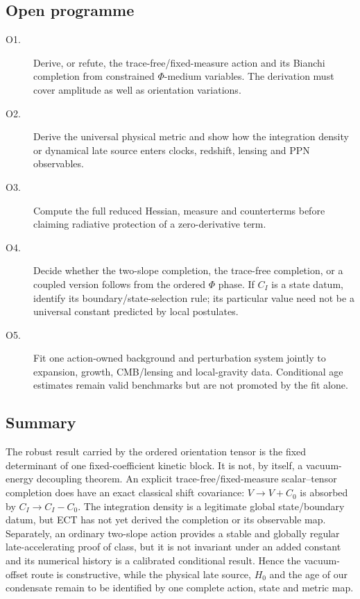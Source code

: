 \subsection{Open programme}
\label{subsec:cc_open}

\begin{description}
\item[O1.] Derive, or refute, the trace-free/fixed-measure action and its
Bianchi completion from constrained $\Phi$-medium variables.  The derivation
must cover amplitude as well as orientation variations.
\item[O2.] Derive the universal physical metric and show how the integration
density or dynamical late source enters clocks, redshift, lensing and PPN
observables.
\item[O3.] Compute the full reduced Hessian, measure and counterterms before
claiming radiative protection of a zero-derivative term.
\item[O4.] Decide whether the two-slope completion, the trace-free completion,
or a coupled version follows from the ordered $\Phi$ phase.  If $C_I$ is a
state datum, identify its boundary/state-selection rule; its particular
value need not be a universal constant predicted by local postulates.
\item[O5.] Fit one action-owned background and perturbation system jointly to
expansion, growth, CMB/lensing and local-gravity data.  Conditional age
estimates remain valid benchmarks but are not promoted by the fit alone.
\end{description}

\subsection{Summary}
\label{subsec:cc_summary}

The robust result carried by the ordered orientation tensor is the fixed
determinant of one fixed-coefficient kinetic block.  It is not, by itself, a
vacuum-energy decoupling theorem.  An explicit trace-free/fixed-measure
scalar--tensor completion does have an exact classical shift covariance:
$V\to V+C_0$ is absorbed by $C_I\to C_I-C_0$.  The integration density is a
legitimate global state/boundary datum, but ECT has not yet derived the
completion or its observable map.  Separately, an ordinary two-slope action
provides a stable and globally regular late-accelerating proof of class, but
it is not invariant under an added constant and its numerical history is a
calibrated conditional result.  Hence the vacuum-offset route is
constructive, while the physical late source, $H_0$ and the age of our
condensate remain to be identified by one complete action, state and metric
map.

